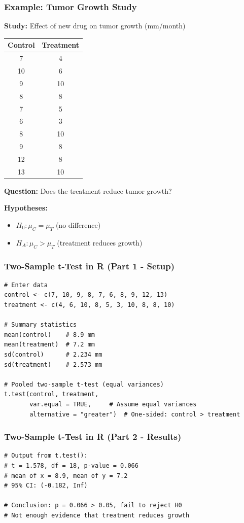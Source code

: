\documentclass{beamer}
\begin{document}
\begin{frame}
\frametitle{Example: Tumor Growth Study}
\textbf{Study:} Effect of new drug on tumor growth (mm/month)

\begin{center}
\renewcommand{\arraystretch}{0.9}
\begin{tabular}{cc}
\toprule
Control & Treatment \\
\midrule
7 & 4 \\
10 & 6 \\
9 & 10 \\
8 & 8 \\
7 & 5 \\
6 & 3 \\
8 & 10 \\
9 & 8 \\
12 & 8 \\
13 & 10 \\
\bottomrule
\end{tabular}
\end{center}

\vspace{0.05cm}
\textbf{Question:} Does the treatment reduce tumor growth?

\small
\textbf{Hypotheses:}
\begin{itemize}
\setlength\itemsep{-0.3em}
\item $H_0: \mu_C = \mu_T$ (no difference)
\item $H_A: \mu_C > \mu_T$ (treatment reduces growth)
\end{itemize}
\end{frame}

\begin{frame}[fragile]
\frametitle{Two-Sample t-Test in R (Part 1 - Setup)}
\small
\begin{verbatim}
# Enter data
control <- c(7, 10, 9, 8, 7, 6, 8, 9, 12, 13)
treatment <- c(4, 6, 10, 8, 5, 3, 10, 8, 8, 10)

# Summary statistics
mean(control)    # 8.9 mm
mean(treatment)  # 7.2 mm
sd(control)      # 2.234 mm
sd(treatment)    # 2.573 mm

# Pooled two-sample t-test (equal variances)
t.test(control, treatment,
       var.equal = TRUE,     # Assume equal variances
       alternative = "greater")  # One-sided: control > treatment
\end{verbatim}
\end{frame}

\begin{frame}[fragile]
\frametitle{Two-Sample t-Test in R (Part 2 - Results)}
\small
\begin{verbatim}
# Output from t.test():
# t = 1.578, df = 18, p-value = 0.066
# mean of x = 8.9, mean of y = 7.2
# 95% CI: (-0.182, Inf)

# Conclusion: p = 0.066 > 0.05, fail to reject H0
# Not enough evidence that treatment reduces growth
\end{verbatim}
\end{frame}
\end{document}
